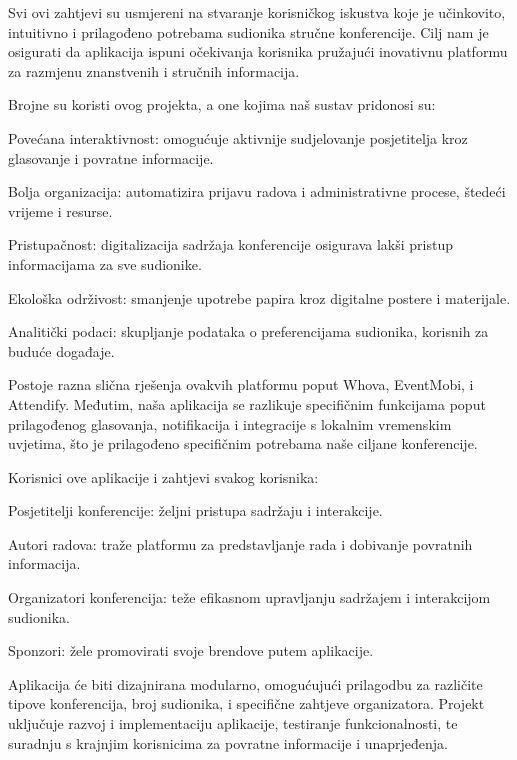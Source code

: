		Svi ovi zahtjevi su usmjereni na stvaranje korisničkog iskustva koje je učinkovito, intuitivno i prilagođeno potrebama sudionika stručne konferencije. Cilj nam je osigurati da aplikacija ispuni očekivanja korisnika pružajući inovativnu platformu za razmjenu znanstvenih i stručnih informacija.
		
		Brojne su koristi ovog projekta, a one kojima naš sustav pridonosi su: 
		
		\begin{packed_item}
			\item Povećana interaktivnost: omogućuje aktivnije sudjelovanje posjetitelja kroz glasovanje i povratne informacije.
			\item Bolja organizacija: automatizira prijavu radova i administrativne procese, štedeći vrijeme i resurse.
			\item Pristupačnost: digitalizacija sadržaja konferencije osigurava lakši pristup informacijama za sve sudionike.
			\item Ekološka održivost: smanjenje upotrebe papira kroz digitalne postere i materijale.
			\item Analitički podaci: skupljanje podataka o preferencijama sudionika, korisnih za buduće događaje.
		\end{packed_item}

		Postoje razna slična rješenja ovakvih platformu poput Whova, EventMobi, i Attendify. Međutim, naša aplikacija se razlikuje specifičnim funkcijama poput prilagođenog glasovanja, notifikacija i integracije s lokalnim vremenskim uvjetima, što je prilagođeno specifičnim potrebama naše ciljane konferencije.
		
		Korisnici ove aplikacije i zahtjevi svakog korisnika:
		\begin{packed_item}
			\item Posjetitelji konferencije: željni pristupa sadržaju i interakcije.
			\item Autori radova: traže platformu za predstavljanje rada i dobivanje povratnih informacija.
			\item Organizatori konferencija: teže efikasnom upravljanju sadržajem i interakcijom sudionika.
			\item Sponzori: žele promovirati svoje brendove putem aplikacije.
		\end{packed_item}
		Aplikacija će biti dizajnirana modularno, omogućujući prilagodbu za različite tipove konferencija, broj sudionika, i specifične zahtjeve organizatora. Projekt uključuje razvoj i implementaciju aplikacije, testiranje funkcionalnosti, te suradnju s krajnjim korisnicima za povratne informacije i unaprjeđenja.
		
